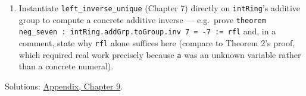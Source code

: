 \begin{enumerate}
  Prove \texttt{theorem neg\_\allowbreak{}mul (a b : R) : Rg.mul (Rg.addGrp.toGroup.inv a) b = Rg.addGrp.toGroup.inv (Rg.mul a b)}. Strategy: this is ``show \(x = -(ab)\),'' hence reduce through \texttt{left\_\allowbreak{}inverse\_\allowbreak{}unique} to ``show \(x + ab = 0\),'' then look for a \texttt{right\_\allowbreak{}distrib}-shaped simplification of \((-a)\cdot b + a \cdot b\), exactly as in Theorem 2. \texttt{mul\_\allowbreak{}zero\_\allowbreak{}left} (proved in Theorem 2's section) is required at the end, the same way Theorem 2 itself used it.
\item
  Instantiate \texttt{left\_\allowbreak{}inverse\_\allowbreak{}unique} (Chapter 7) directly on \texttt{intRing}'s additive group to compute a concrete additive inverse --- e.g.~prove \texttt{theorem neg\_\allowbreak{}seven : intRing.addGrp.toGroup.inv 7 = -\allowbreak{}7 := rfl} and, in a comment, state why \texttt{rfl} alone suffices here (compare to Theorem 2's proof, which required real work precisely because \texttt{a} was an unknown variable rather than a concrete numeral).
\end{enumerate}

Solutions: \hyperref[sec:14-appendix-solutions:08-chapter-9:1]{Appendix, Chapter 9}.

